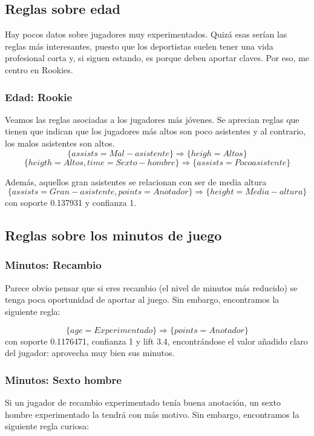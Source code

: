 \subsection{Reglas sobre edad}
Hay pocos datos sobre jugadores muy experimentados. Quizá esas serían las reglas más interesantes, puesto que los deportistas suelen tener una vida profesional corta y, si siguen estando, es porque deben aportar claves. Por eso, me centro en Rookies.

\subsubsection{Edad: Rookie}
Veamos las reglas asociadas a los jugadores más jóvenes. Se aprecian reglas que tienen que indican que los jugadores más altos son poco asistentes y al contrario, los malos asistentes son altos. 
$$\{assists = Mal-asistente\} \Rightarrow \{heigh=Altos\}$$
$$\{heigth = Altos, time=Sexto-hombre\} \Rightarrow \{assists=Poco asistente\}$$

Además, aquellos gran asistentes se relacionan con ser de media altura
$$\{assists = Gran-asistente, points=Anotador\} \Rightarrow \{height = Media-altura\}$$
con soporte 0.137931 y confianza 1.

\subsection{Reglas sobre los minutos de juego}

\subsubsection{Minutos: Recambio}
Parece obvio pensar que si eres recambio (el nivel de minutos más reducido) se tenga poca oportunidad de aportar al juego. Sin embargo, encontramos la siguiente regla:

$$\{age=Experimentado\} \Rightarrow \{points=Anotador\}$$
con soporte 0.1176471, confianza 1 y lift 3.4, encontrándose el valor añadido claro del jugador: aprovecha muy bien sus minutos. 

\subsubsection{Minutos: Sexto hombre}
Si un jugador de recambio experimentado tenía buena anotación, un sexto hombre experimentado la tendrá con más motivo. Sin embargo, encontramos la siguiente regla curiosa:

